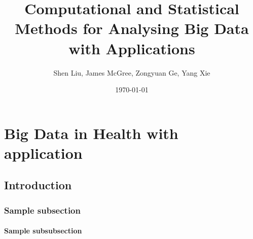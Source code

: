 \documentclass{book}
\title{Computational and Statistical Methods for Analysing Big Data with Applications}
\author{Shen Liu, James McGree, Zongyuan Ge, Yang Xie}
\date{\today}
\begin{document}
 
\maketitle
 
\tableofcontents
 
 
\chapter{Big Data in Health with application}
 
\section{Introduction}

 
\subsection{Sample subsection}

 
\subsubsection{Sample subsubsection}
\end{document}
